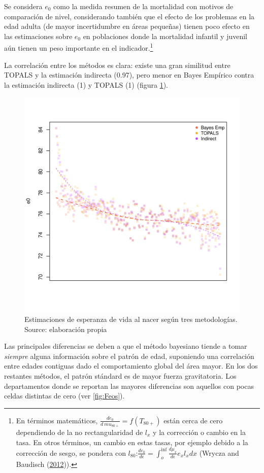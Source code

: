 \documentclass[12pt,]{article}
\begin{document}
Se considera \(e_0\) como la medida resumen de la mortalidad con motivos
de comparación de nivel, considerando también que el efecto de los
problemas en la edad adulta (de mayor incertidumbre en áreas pequeñas)
tienen poco efecto en las estimaciones sobre \(e_0\) en poblaciones
donde la mortalidad infantil y juvenil aún tienen un peso importante en
el indicador.\footnote{En términos matemáticos,
  \(\frac{de_0} {d \ mu_ {80 +}} = f (T_ {80 +})\) están cerca de cero
  dependiendo de la no rectangularidad de \(l_x\) y la corrección o
  cambio en la tasa. En otros términos, un cambio en estas tasas, por
  ejemplo debido a la corrección de sesgo, se pondera con
  \(l_{80}\):\(\frac{de_0} {d \epsilon} = \int_{o}^{\inf}{\frac{d\mu_x} {d \epsilon} e_x l_x dx}\)
  (Wrycza and Baudisch (\protect\hyperlink{ref-Wrycza2012}{2012})).}

La correlación entre los métodos es clara: existe una gran similitud
entre TOPALS y la estimación indirecta (0.97), pero menor en Bayes
Empírico contra la estimación indirecta (1) y TOPALS (1) (figura
\ref{fig:comparativeMeth}).

\begin{figure}

{\centering \includegraphics[width=0.7\linewidth]{analysis/plots/CompMethods} 

}

\caption{Estimaciones de esperanza de vida al nacer según tres metodologías. Source: elaboración propia}\label{fig:comparativeMeth}
\end{figure}

Las principales diferencias se deben a que el método bayesiano tiende a
tomar \emph{siempre} alguna información sobre el patrón de edad,
suponiendo una correlación entre edades contiguas dado el comportamiento
global del área mayor. En los dos restantes métodos, el patrón stándard
es de mayor fuerza gravitatoria. Los departamentos donde se reportan las
mayores diferencias son aquellos con pocas celdas distintas de cero (ver
\ref{fig:Feos}).
\end{document}
